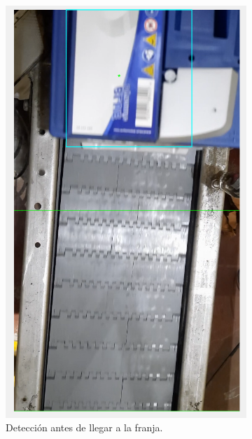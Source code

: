 \documentclass[11pt]{memoir}
\begin{document}
\begin{center}
\begin{figure}[H]
\begin{subfigure}{0.4\textwidth}
    \includegraphics[width=\textwidth]{img/P1}
    \caption{Detección antes de llegar a la franja.}
    \label{fig:treal1}
\end{subfigure}
\hfill
\begin{subfigure}{0.4\textwidth}

\end{subfigure}
\end{figure}
\end{center}
\end{document}
